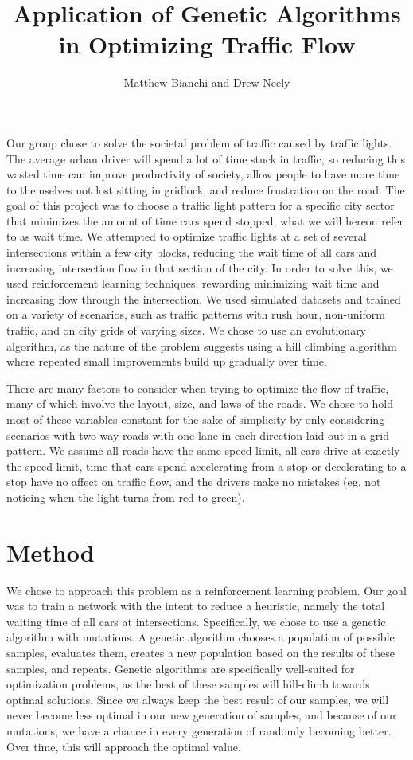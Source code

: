 \documentclass[12pt, letterpaper]{article}
\title{Application of Genetic Algorithms in Optimizing Traffic Flow}
\author{Matthew Bianchi and Drew Neely}
\begin{document}
\maketitle

Our group chose to solve the societal problem of traffic caused by traffic lights. 
The average urban driver will spend a lot of time stuck in traffic, so reducing this wasted time can improve productivity of society, allow people to have more time to themselves not lost sitting in gridlock, and reduce frustration on the road.
The goal of this project was to choose a traffic light pattern for a specific city sector that minimizes the amount of time cars spend stopped, what we will hereon refer to as wait time.
We attempted to optimize traffic lights at a set of several intersections within a few city blocks, reducing the wait time of all cars and increasing intersection flow in that section of the city. 
In order to solve this, we used reinforcement learning techniques, rewarding minimizing wait time and increasing flow through the intersection. 
We used simulated datasets and trained on a variety of scenarios, such as traffic patterns with rush hour, non-uniform traffic, and on city grids of varying sizes. 
We chose to use an evolutionary algorithm, as the nature of the problem suggests using a hill climbing algorithm where repeated small improvements build up gradually over time. 

There are many factors to consider when trying to optimize the flow of traffic, many of which involve the layout, size, and laws of the roads.
We chose to hold most of these variables constant for the sake of simplicity by only considering scenarios with two-way roads with one lane in each direction laid out in a grid pattern. 
We assume all roads have the same speed limit, all cars drive at exactly the speed limit, time that cars spend accelerating from a stop or decelerating to a stop have no affect on traffic flow, and the drivers make no mistakes (eg. not noticing when the light turns from red to green).

\section*{Method}

We chose to approach this problem as a reinforcement learning problem.
Our goal was to train a network with the intent to reduce a heuristic, namely the total waiting time of all cars at intersections.
Specifically, we chose to use a genetic algorithm with mutations.
A genetic algorithm chooses a population of possible samples, evaluates them, creates a new population based on the results of these samples, and repeats.
Genetic algorithms are specifically well-suited for optimization problems, as the best of these samples will hill-climb towards optimal solutions.
Since we always keep the best result of our samples, we will never become less optimal in our new generation of samples, and because of our mutations, we have a chance in every generation of randomly becoming better.
Over time, this will approach the optimal value.
\end{document}
